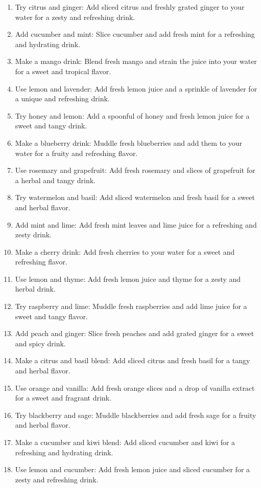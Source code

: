 \begin{enumerate}
\item Try citrus and ginger: Add sliced citrus and freshly grated ginger to your water for a zesty and refreshing drink.
\item Add cucumber and mint: Slice cucumber and add fresh mint for a refreshing and hydrating drink.
\item Make a mango drink: Blend fresh mango and strain the juice into your water for a sweet and tropical flavor.
\item Use lemon and lavender: Add fresh lemon juice and a sprinkle of lavender for a unique and refreshing drink.
\item Try honey and lemon: Add a spoonful of honey and fresh lemon juice for a sweet and tangy drink.
\item Make a blueberry drink: Muddle fresh blueberries and add them to your water for a fruity and refreshing flavor.
\item Use rosemary and grapefruit: Add fresh rosemary and slices of grapefruit for a herbal and tangy drink.
\item Try watermelon and basil: Add sliced watermelon and fresh basil for a sweet and herbal flavor.
\item Add mint and lime: Add fresh mint leaves and lime juice for a refreshing and zesty drink.
\item Make a cherry drink: Add fresh cherries to your water for a sweet and refreshing flavor.
\item Use lemon and thyme: Add fresh lemon juice and thyme for a zesty and herbal drink.
\item Try raspberry and lime: Muddle fresh raspberries and add lime juice for a sweet and tangy flavor.
\item Add peach and ginger: Slice fresh peaches and add grated ginger for a sweet and spicy drink.
\item Make a citrus and basil blend: Add sliced citrus and fresh basil for a tangy and herbal flavor.
\item Use orange and vanilla: Add fresh orange slices and a drop of vanilla extract for a sweet and fragrant drink.
\item Try blackberry and sage: Muddle blackberries and add fresh sage for a fruity and herbal flavor.
\item Make a cucumber and kiwi blend: Add sliced cucumber and kiwi for a refreshing and hydrating drink.
\item Use lemon and cucumber: Add fresh lemon juice and sliced cucumber for a zesty and refreshing drink.

\end{enumerate}
